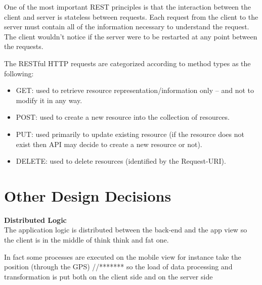 \documentclass[../RASD.tex]{subfiles}
\begin{document}
    One of the most important REST principles is that the interaction between the client and server is stateless between requests. Each request from the client to the server must contain all of the information necessary to understand the request. The client wouldn’t notice if the server were to be restarted at any point between the requests.

    The RESTful HTTP requests are categorized according to method types as the following:
    \\
    \begin{itemize}
        \item GET: used to retrieve resource representation/information only – and not to modify it in any way.
        \item POST: used to create a new resource into the collection of resources.
        \item PUT: used primarily to update existing resource (if the resource does not exist
        then API may decide to create a new resource or not).
        \item DELETE: used to delete resources (identified by the Request-URI).
    \end{itemize}
    \newpage
    \section{Other Design Decisions}\label{sec:other-design-decisions}
    \textbf{Distributed Logic} \\
    The application logic is distributed between the back-end and the app view so the client is in the middle of think think and fat one.

    In fact some processes are executed on the mobile view for instance take the position (through the GPS) //******* so the load of data processing and transformation is put both on the client side and on the server side
\end{document}
